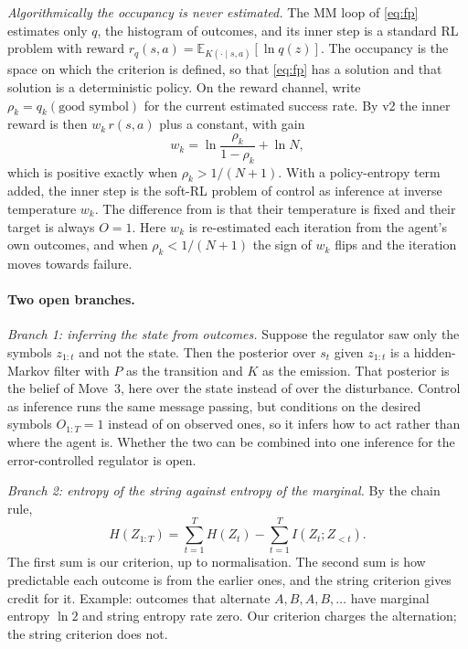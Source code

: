 \documentclass[10pt]{article}
\theoremstyle{plain}
\newcommand{\E}{\mathbb E}
\begin{document}
\emph{Algorithmically the occupancy is never estimated.}
The MM loop of \eqref{eq:fp} estimates only $q$, the histogram of outcomes, and its inner step is a standard RL problem with reward $r_q(s,a) = \E_{K(\cdot \mid s,a)}[\ln q(z)]$.
The occupancy is the space on which the criterion is defined, so that \eqref{eq:fp} has a solution and that solution is a deterministic policy.
On the reward channel, write $\rho_k = q_k(\text{good symbol})$ for the current estimated success rate.
By v2 the inner reward is then $w_k\, r(s,a)$ plus a constant, with gain
\begin{equation*}
  w_k = \ln\frac{\rho_k}{1-\rho_k} + \ln N ,
\end{equation*}
which is positive exactly when $\rho_k > 1/(N+1)$.
With a policy-entropy term added, the inner step is the soft-RL problem of control as inference at inverse temperature $w_k$.
The difference from \citet{Toussaint-probabilistic06} is that their temperature is fixed and their target is always $O = 1$.
Here $w_k$ is re-estimated each iteration from the agent's own outcomes, and when $\rho_k < 1/(N+1)$ the sign of $w_k$ flips and the iteration moves towards failure.

\paragraph{Two open branches.}
\emph{Branch 1: inferring the state from outcomes.}
Suppose the regulator saw only the symbols $z_{1:t}$ and not the state.
Then the posterior over $s_t$ given $z_{1:t}$ is a hidden-Markov filter with $P$ as the transition and $K$ as the emission.
That posterior is the belief of Move~3, here over the state instead of over the disturbance.
Control as inference runs the same message passing, but conditions on the desired symbols $O_{1:T} = 1$ instead of on observed ones, so it infers how to act rather than where the agent is.
Whether the two can be combined into one inference for the error-controlled regulator is open.

\emph{Branch 2: entropy of the string against entropy of the marginal.}
By the chain rule,
\begin{equation*}
  H(Z_{1:T}) = \sum_{t=1}^{T} H(Z_t) - \sum_{t=1}^{T} I(Z_t ; Z_{<t}) .
\end{equation*}
The first sum is our criterion, up to normalisation.
The second sum is how predictable each outcome is from the earlier ones, and the string criterion gives credit for it.
Example: outcomes that alternate $A, B, A, B, \dots$ have marginal entropy $\ln 2$ and string entropy rate zero.
Our criterion charges the alternation; the string criterion does not.
\end{document}
